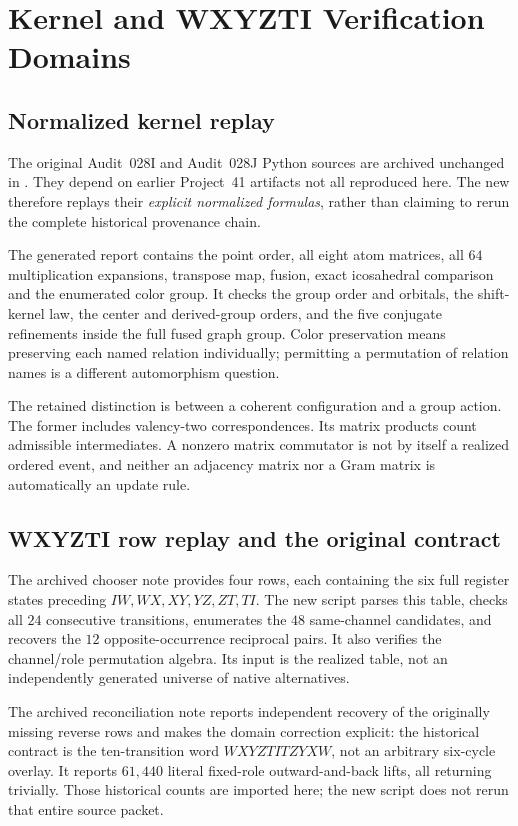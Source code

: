 \section{Kernel and WXYZTI Verification Domains}\label{app:kernelreplay}
\subsection{Normalized kernel replay}
The original Audit~028I and Audit~028J Python sources are archived unchanged in . They depend on earlier Project~41 artifacts not all reproduced here. The new  therefore replays their \emph{explicit normalized formulas}, rather than claiming to rerun the complete historical provenance chain.

The generated report contains the point order, all eight atom matrices, all $64$ multiplication expansions, transpose map, fusion, exact icosahedral comparison and the enumerated color group. It checks the group order and orbitals, the shift-kernel law, the center and derived-group orders, and the five conjugate refinements inside the full fused graph group. Color preservation means preserving each named relation individually; permitting a permutation of relation names is a different automorphism question.

The retained distinction is between a coherent configuration and a group action. The former includes valency-two correspondences. Its matrix products count admissible intermediates. A nonzero matrix commutator is not by itself a realized ordered event, and neither an adjacency matrix nor a Gram matrix is automatically an update rule.

\subsection{WXYZTI row replay and the original contract}
The archived chooser note provides four rows, each containing the six full register states preceding $IW,WX,XY,YZ,ZT,TI$. The new script parses this table, checks all $24$ consecutive transitions, enumerates the $48$ same-channel candidates, and recovers the $12$ opposite-occurrence reciprocal pairs. It also verifies the channel/role permutation algebra. Its input is the realized table, not an independently generated universe of native alternatives.

The archived reconciliation note reports independent recovery of the originally missing reverse rows and makes the domain correction explicit: the historical contract is the ten-transition word $WXYZTITZYXW$, not an arbitrary six-cycle overlay. It reports $61{,}440$ literal fixed-role outward-and-back lifts, all returning trivially. Those historical counts are imported here; the new script does not rerun that entire source packet.


